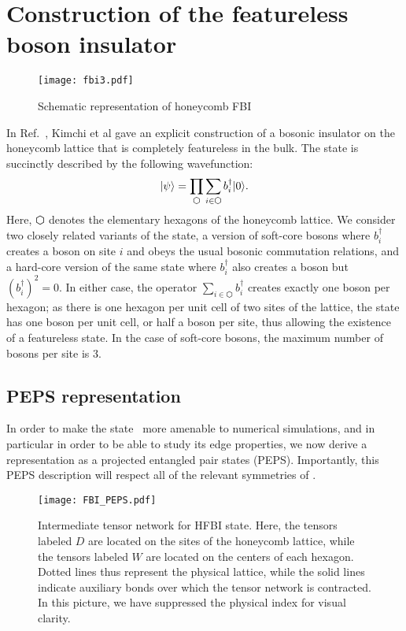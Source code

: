 
\section{Construction of the featureless boson insulator}
\label{sec:fbi}

\begin{figure}
	\centering
	\texttt{[image: fbi3.pdf]}
	\caption{Schematic representation of honeycomb FBI}
\end{figure}

In Ref.~, Kimchi et al gave an explicit
construction of a bosonic insulator
on the honeycomb lattice that is completely featureless in the bulk.
The state is succinctly described by the following wavefunction:
\begin{equation} \label{eq:def}
\ket{\psi} = \prod\limits_{\varhexagon} \sum\limits_{i \in
\varhexagon} b^{\dagger}_{i} \ket{0}.
\end{equation}
Here, $\varhexagon$ denotes the elementary hexagons of the honeycomb
lattice. We consider two closely related variants of the state, a
version of soft-core bosons where $b_i^\dagger$ creates a boson on
site $i$ and obeys the usual bosonic commutation relations, and a
hard-core version of the same state where $b_i^\dagger$ also creates a
boson but $(b_i^\dagger)^2=0$. In either case, the operator $\sum_{i
\in \varhexagon} b^{\dagger}_{i}$ creates exactly one boson per
hexagon; as there is one hexagon per unit cell of two sites of the
lattice, the state has one boson per unit cell, or half a boson per
site, thus allowing the existence of a featureless state.
In the case of soft-core bosons, the maximum number of bosons
per site is 3.


\subsection{PEPS representation}

In order to make the state~ more amenable to numerical
simulations, and in particular in order to be able to study its edge
properties, we now derive a representation as a projected entangled
pair states (PEPS). Importantly, this PEPS description will respect
all of the relevant symmetries of .

\begin{figure}
	\centering
	\texttt{[image: FBI\_PEPS.pdf]}
	\caption{
	Intermediate tensor network for HFBI state. Here, the tensors labeled
	$D$ are located on the sites of the honeycomb lattice, while the
	tensors labeled $W$ are located on the centers of each hexagon.
	Dotted lines thus represent the physical lattice, while the solid
	lines indicate auxiliary bonds over which the tensor network is
	contracted. In this picture, we have suppressed the physical index
	for visual clarity.}
	\label{fig:FBI_PEPS}
\end{figure}

